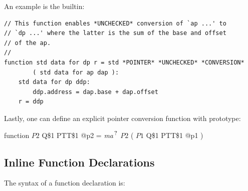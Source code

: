 \documentclass[12pt]{article}
\newcommand{\QMARK}{{$^{\,\mbox{\footnotesize ?}}$}}
\newenvironment{indpar}[1][0.3in]%
	{\begin{list}{}%
		     {\setlength{\itemsep}{0in}%
		      \setlength{\topsep}{0in}%
		      \setlength{\parsep}{1ex}%
		      \setlength{\labelwidth}{#1}%
		      \setlength{\leftmargin}{#1}%
		      \addtolength{\leftmargin}{\labelsep}}%
	 \item}%
	{\end{list}}
\begin{document}
An example is the builtin:
\begin{indpar}\begin{verbatim}
// This function enables *UNCHECKED* conversion of `ap ...' to
// `dp ...' where the latter is the sum of the base and offset
// of the ap.
//
function std data for dp r = std *POINTER* *UNCHECKED* *CONVERSION*
        ( std data for ap dap ):
    std data for dp ddp:
        ddp.address = dap.base + dap.offset
    r = ddp
\end{verbatim}\end{indpar}

Lastly, one can define an explicit pointer conversion function with
prototype:
\begin{indpar}
function $P2$ Q\$1 PTT\$1 @p2 = {\em ma}\QMARK{} $P2$ ( $P1$ Q\$1 PTT\$1 @p1 )
\end{indpar}

\subsection{Inline Function Declarations}
\label{INLINE-FUNCTION-DECLARATIONS}

The syntax of a function declaration is:
\end{document}
